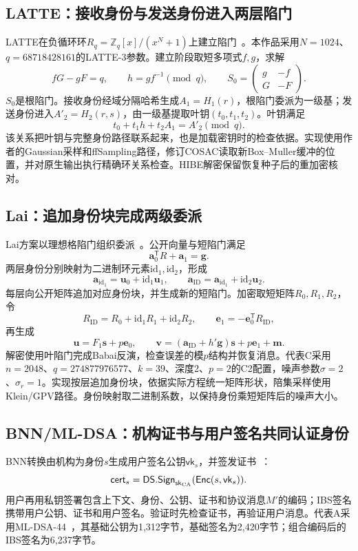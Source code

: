 \subsection{LATTE：接收身份与发送身份进入两层陷门}
LATTE在负循环环$R_q=\mathbb Z_q[x]/(x^N+1)$上建立陷门~\cite{zhao2024latte}。本作品采用$N=1024$、$q=68718428161$的LATTE-3参数。建立阶段取短多项式$f,g$，求解
\[
 fG-gF=q,\qquad h=gf^{-1}\pmod q,
 \qquad S_0=\begin{pmatrix}g&-f\\G&-F\end{pmatrix}.
\]
$S_0$是根陷门。接收身份经域分隔哈希生成$A_1=H_1(r)$，根陷门委派为一级基；发送身份进入$A'_2=H_2(r,s)$，由一级基提取叶钥$(t_0,t_1,t_2)$。叶钥满足
\[
 t_0+t_1h+t_2A_1=A'_2\pmod q.
\]
该关系把叶钥与完整身份路径联系起来，也是加载密钥时的检查依据。实现使用作者的Gaussian采样和ffSampling路径，修订COSAC读取新Box--Muller缓冲的位置，并对原生输出执行精确环关系检查。HIBE解密保留恢复种子后的重加密核对。

\subsection{Lai：追加身份块完成两级委派}
Lai方案以理想格陷门组织委派~\cite{lai2015trapdoors}。公开向量与短陷门满足
\[
 \mathbf a_0^{\mathsf T}R+\mathbf a_1=\mathbf g.
\]
两层身份分别映射为二进制环元素$\mathrm{id}_1,\mathrm{id}_2$，形成
\[
 \mathbf a_{\mathrm{id}_1}=\mathbf u_0+\mathrm{id}_1\mathbf u_1,
 \qquad \mathbf a_{\mathrm{ID}}=\mathbf a_{\mathrm{id}_1}+\mathrm{id}_2\mathbf u_2.
\]
每层向公开矩阵追加对应身份块，并生成新的短陷门。加密取短矩阵$R_0,R_1,R_2$，令
\[
 R_{\mathrm{ID}}=R_0+\mathrm{id}_1R_1+\mathrm{id}_2R_2,
 \qquad\mathbf e_1=-\mathbf e_0^{\mathsf T}R_{\mathrm{ID}},
\]
再生成
\[
 \mathbf u=F_1\mathbf s+p\mathbf e_0,\qquad
 \mathbf v=(\mathbf a_{\mathrm{ID}}+h'\mathbf g)\mathbf s+p\mathbf e_1+\mathbf m.
\]
解密使用叶陷门完成Babai反演，检查误差的模$p$结构并恢复消息。代表C采用$n=2048$、$q=274877976577$、$k=39$、深度2、$p=2$的C2配置，噪声参数$\sigma=2$、$\sigma_r=1$。实现按层追加身份块，依据实际方程统一矩阵形状，陪集采样使用Klein/GPV路径。身份映射取二进制系数，以保持身份乘短矩阵后的噪声大小。

\subsection{BNN/ML-DSA：机构证书与用户签名共同认证身份}
BNN转换由机构为身份$s$生成用户签名公钥$\mathsf{vk}_s$，并签发证书~\cite{galindo2006ibs}：
\[
 \mathsf{cert}_s=\mathsf{DS.Sign}_{\mathsf{sk}_{\rm CA}}
     (\mathsf{Enc}(s,\mathsf{vk}_s)).
\]
用户再用私钥签署包含上下文、身份、公钥、证书和协议消息$M'$的编码；IBS签名携带用户公钥、证书和用户签名。验证时先检查证书，再验证用户消息。代表A采用ML-DSA-44~\cite{nist2024fips204}，其基础公钥为1,312字节，基础签名为2,420字节；组合编码后的IBS签名为6,237字节。

